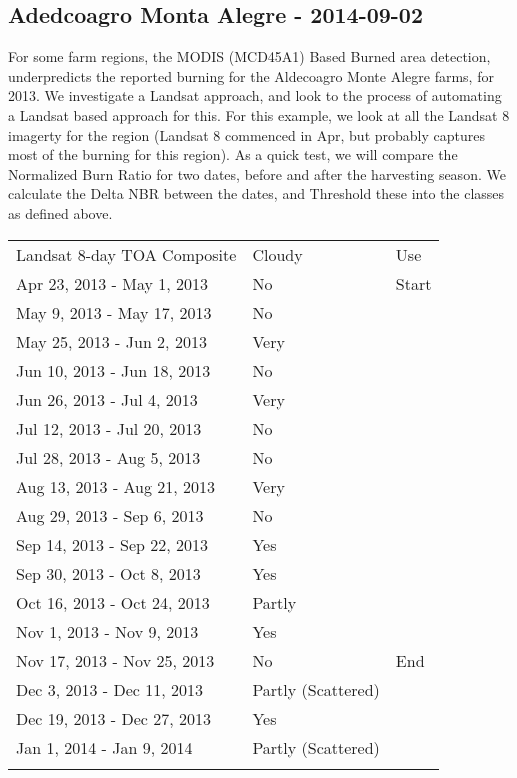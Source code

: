 \documentclass[]{article}
\begin{document}
\subsection{Adedcoagro Monta Alegre -
2014-09-02}\label{adedcoagro-monta-alegre---2014-09-02}

For some farm regions, the MODIS (MCD45A1) Based Burned area detection,
underpredicts the reported burning for the Aldecoagro Monte Alegre
farms, for 2013. We investigate a Landsat approach, and look to the
process of automating a Landsat based approach for this. For this
example, we look at all the Landsat 8 imagerty for the region (Landsat 8
commenced in Apr, but probably captures most of the burning for this
region). As a quick test, we will compare the Normalized Burn Ratio for
two dates, before and after the harvesting season. We calculate the
Delta NBR between the dates, and Threshold these into the classes as
defined above.

\begin{longtable}[c]{@{}lll@{}}
\toprule\addlinespace
Landsat 8-day TOA Composite & Cloudy & Use
\\\addlinespace
\midrule\endhead
Apr 23, 2013 - May 1, 2013 & No & Start
\\\addlinespace
May 9, 2013 - May 17, 2013 & No
\\\addlinespace
May 25, 2013 - Jun 2, 2013 & Very
\\\addlinespace
Jun 10, 2013 - Jun 18, 2013 & No
\\\addlinespace
Jun 26, 2013 - Jul 4, 2013 & Very
\\\addlinespace
Jul 12, 2013 - Jul 20, 2013 & No
\\\addlinespace
Jul 28, 2013 - Aug 5, 2013 & No
\\\addlinespace
Aug 13, 2013 - Aug 21, 2013 & Very
\\\addlinespace
Aug 29, 2013 - Sep 6, 2013 & No
\\\addlinespace
Sep 14, 2013 - Sep 22, 2013 & Yes
\\\addlinespace
Sep 30, 2013 - Oct 8, 2013 & Yes
\\\addlinespace
Oct 16, 2013 - Oct 24, 2013 & Partly
\\\addlinespace
Nov 1, 2013 - Nov 9, 2013 & Yes
\\\addlinespace
Nov 17, 2013 - Nov 25, 2013 & No & End
\\\addlinespace
Dec 3, 2013 - Dec 11, 2013 & Partly (Scattered)
\\\addlinespace
Dec 19, 2013 - Dec 27, 2013 & Yes
\\\addlinespace
Jan 1, 2014 - Jan 9, 2014 & Partly (Scattered)
\\\addlinespace
\bottomrule
\end{longtable}
\end{document}

